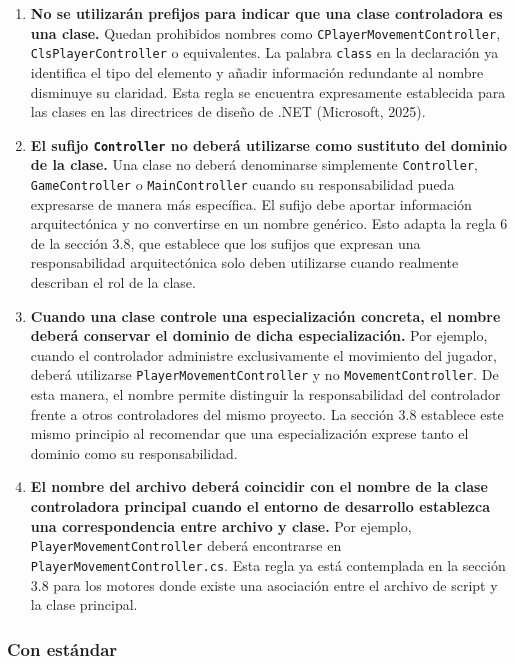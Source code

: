 \begin{enumerate}
\item \textbf{No se utilizarán prefijos para indicar que una clase controladora es una clase.} Quedan prohibidos nombres como \texttt{CPlayerMovementController}, \texttt{ClsPlayerController} o equivalentes. La palabra \texttt{class} en la declaración ya identifica el tipo del elemento y añadir información redundante al nombre disminuye su claridad. Esta regla se encuentra expresamente establecida para las clases en las directrices de diseño de .NET (Microsoft, 2025).

\item \textbf{El sufijo \texttt{Controller} no deberá utilizarse como sustituto del dominio de la clase.} Una clase no deberá denominarse simplemente \texttt{Controller}, \texttt{GameController} o \texttt{MainController} cuando su responsabilidad pueda expresarse de manera más específica. El sufijo debe aportar información arquitectónica y no convertirse en un nombre genérico. Esto adapta la regla 6 de la sección 3.8, que establece que los sufijos que expresan una responsabilidad arquitectónica solo deben utilizarse cuando realmente describan el rol de la clase.

\item \textbf{Cuando una clase controle una especialización concreta, el nombre deberá conservar el dominio de dicha especialización.} Por ejemplo, cuando el controlador administre exclusivamente el movimiento del jugador, deberá utilizarse \texttt{PlayerMovementController} y no \texttt{MovementController}. De esta manera, el nombre permite distinguir la responsabilidad del controlador frente a otros controladores del mismo proyecto. La sección 3.8 establece este mismo principio al recomendar que una especialización exprese tanto el dominio como su responsabilidad.

\item \textbf{El nombre del archivo deberá coincidir con el nombre de la clase controladora principal cuando el entorno de desarrollo establezca una correspondencia entre archivo y clase.} Por ejemplo, \texttt{PlayerMovementController} deberá encontrarse en \texttt{PlayerMovementController.cs}. Esta regla ya está contemplada en la sección 3.8 para los motores donde existe una asociación entre el archivo de script y la clase principal.

\end{enumerate}

\subsubsection{Con estándar}

